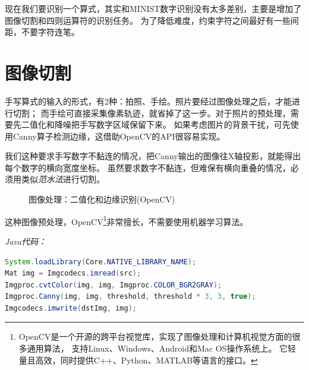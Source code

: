 现在我们要识别一个算式，其实和MINIST数字识别没有太多差别，主要是增加了图像切割和四则运算符的识别任务。
为了降低难度，约束字符之间最好有一些间距，不要字符连笔。


\section{图像切割}
手写算式的输入的形式，有2种：拍照、手绘。照片要经过图像处理之后，才能进行切割；
而手绘可直接采集像素轨迹，就省掉了这一步。对于照片的预处理，需要先二值化和降噪把手写数字区域保留下来。
如果考虑图片的背景干扰，可先使用Canny算子检测边缘，这借助OpenCV的API很容易实现。

我们这种要求手写数字不黏连的情况，把Canny输出的图像往X轴投影，就能得出每个数字的横向宽度坐标。
虽然要求数字不黏连，但难保有横向重叠的情况，必须用类似\emph{范水法}进行切割。

\begin{figure}[!htb] \centering 
{}
\caption{图像处理：二值化和边缘识别(OpenCV)}
\end{figure}

\noindent
这种图像预处理，OpenCV\footnote{OpenCV是一个开源的跨平台视觉库，实现了图像处理和计算机视觉方面的很多通用算法，
支持Linux、Windows、Android和Mac OS操作系统上。
它轻量且高效，同时提供C++、Python、MATLAB等语言的接口。}非常擅长，不需要使用机器学习算法。


\noindent
\emph{Java代码：}
\begin{lstlisting}[language=Java]
System.loadLibrary(Core.NATIVE_LIBRARY_NAME);
Mat img = Imgcodecs.imread(src);
Imgproc.cvtColor(img, img, Imgproc.COLOR_BGR2GRAY);
Imgproc.Canny(img, img, threshold, threshold * 3, 3, true);
Imgcodecs.imwrite(dstImg, img);
\end{lstlisting}

